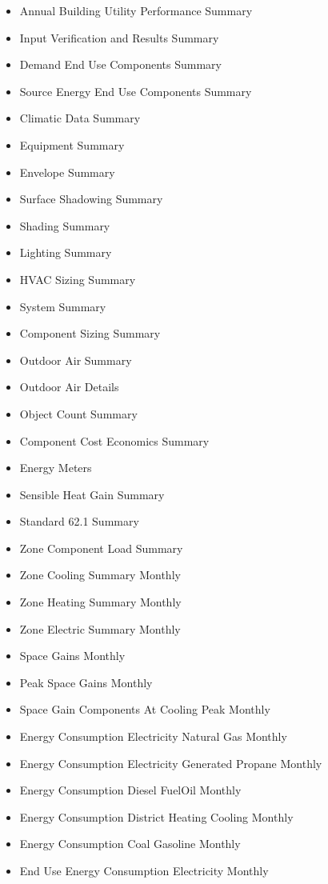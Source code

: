 \begin{itemize}
\item
  Annual Building Utility Performance Summary
\item
  Input Verification and Results Summary
\item
  Demand End Use Components Summary
\item
  Source Energy End Use Components Summary
\item
  Climatic Data Summary
\item
  Equipment Summary
\item
  Envelope Summary
\item
  Surface Shadowing Summary
\item
  Shading Summary
\item
  Lighting Summary
\item
  HVAC Sizing Summary
\item
  System Summary
\item
  Component Sizing Summary
\item
  Outdoor Air Summary
\item
  Outdoor Air Details
\item
  Object Count Summary
\item
  Component Cost Economics Summary
\item
  Energy Meters
\item
  Sensible Heat Gain Summary
\item
  Standard 62.1 Summary
\item
  Zone Component Load Summary
\item
  Zone Cooling Summary Monthly
\item
  Zone Heating Summary Monthly
\item
  Zone Electric Summary Monthly
\item
  Space Gains Monthly
\item
  Peak Space Gains Monthly
\item
  Space Gain Components At Cooling Peak Monthly
\item
  Energy Consumption Electricity Natural Gas Monthly
\item
  Energy Consumption Electricity Generated Propane Monthly
\item
  Energy Consumption Diesel FuelOil Monthly
\item
  Energy Consumption District Heating Cooling Monthly
\item
  Energy Consumption Coal Gasoline Monthly
\item
  End Use Energy Consumption Electricity Monthly

\end{itemize}
